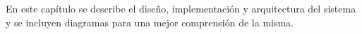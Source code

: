 





En este capítulo se describe el diseño, implementación y arquitectura del sistema y se incluyen diagramas para una
mejor comprensión de la misma.



